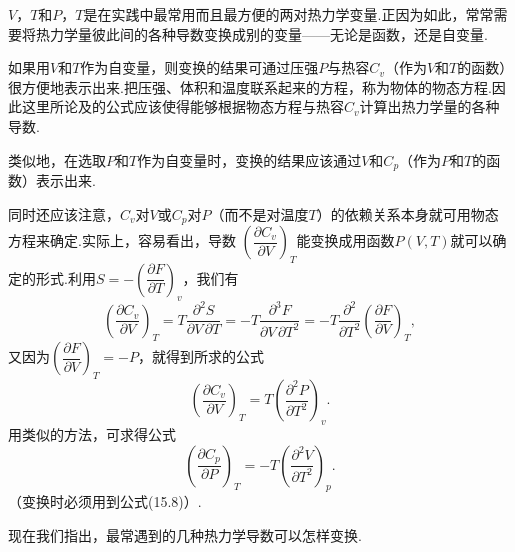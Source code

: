 $V$，$T$和$P$，$T$是在实践中最常用而且最方便的两对热力学变量.正因为如此，常常需要将热力学量彼此间的各种导数变换成别的变量——无论是函数，还是自变量.

如果用$V$和$T$作为自变量，则变换的结果可通过压强$P$与热容$C_v$（作为$V$和$T$的函数）很方便地表示出来.把压强、体积和温度联系起来的方程，称为物体的物态方程.因此这里所论及的公式应该使得能够根据物态方程与热容$C_v$计算出热力学量的各种导数.

类似地，在选取$P$和$T$作为自变量时，变换的结果应该通过$V$和$C_p$（作为$P$和$T$的函数）表示出来.

同时还应该注意，$C_v$对$V$或$C_p$对$P$（而不是对温度$T$）的依赖关系本身就可用物态方程来确定.实际上，容易看出，导数
$\left(\dfrac{\partial C_v}{\partial V}\right)_T$能变换成用函数$P(V,T)$就可以确定的形式.利用$S=-\left(\dfrac{\partial F}{\partial T}\right)_v$，我们有
\begin{equation*}
  \left(\frac{\partial C_v}{\partial V}\right)_T
  =T\frac{\partial^2 S}{\partial V\,\partial T}
  =-T\frac{\partial^3 F}{\partial V\,\partial T^2}
  =-T\frac{\partial^2}{\partial T^2}
  \left(\frac{\partial F}{\partial V}\right)_T,
\end{equation*}
又因为$\left(\dfrac{\partial F}{\partial V}\right)_T=-P$，就得到所求的公式
\begin{equation}
  \left(\frac{\partial C_v}{\partial V}\right)_T
  =T\left(\frac{\partial^2 P}{\partial T^2}\right)_v.
\end{equation}
用类似的方法，可求得公式
\begin{equation}
  \left(\frac{\partial C_p}{\partial P}\right)_T
  =-T\left(\frac{\partial^2 V}{\partial T^2}\right)_p.
\end{equation}
（变换时必须用到公式(15.8)）.

现在我们指出，最常遇到的几种热力学导数可以怎样变换.

